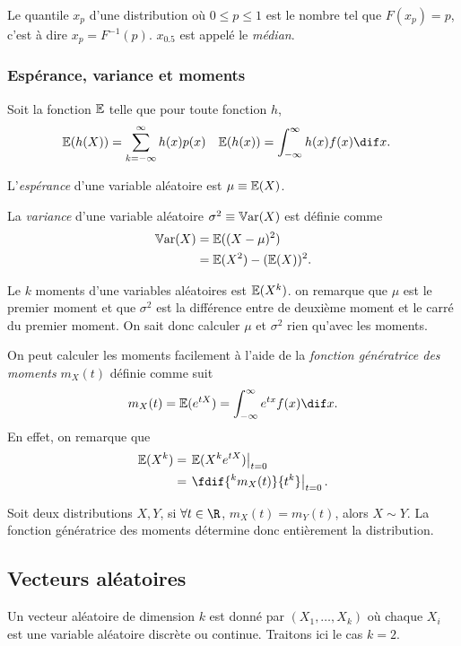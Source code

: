 Le quantile $x_p$ d'une distribution où $0 \leq p \leq 1$ est le nombre tel que
$F(x_p) = p$, c'est à dire $x_p = F^{-1}(p)$.
$x_{0.5}$ est appelé le \emph{médian}.

\subsubsection{Espérance, variance et moments}
Soit la fonction $\mathbb{E}$ telle que pour toute fonction $h$,
\begin{align*}
  \E(h(X)) & = \sum_{k = -\infty}^{\infty} h(x)p(x) & \E(h(x)) & = \int_{-\infty}^\infty h(x)f(x) \dif x.
\end{align*}

L'\emph{espérance} d'une variable aléatoire est $\mu \equiv \mathbb{E}(X)$.

La \emph{variance} d'une variable aléatoire $\sigma^2 \equiv \operatorname{\mathbb{V}ar}(X)$ est définie comme
\begin{align*}
  \operatorname{\mathbb{V}ar}(X) & = \mathbb{E}((X-\mu)^2)\\
          & = \mathbb{E}(X^2) - (\mathbb{E}(X))^2.
\end{align*}

Le $k$\ieme{} moments d'une variables aléatoires est $\mathbb{E}(X^k)$.
on remarque que $\mu$ est le premier moment et que $\sigma^2$ est
la différence entre de deuxième moment et le carré du premier moment.
On sait donc calculer $\mu$ et $\sigma^2$ rien qu'avec les moments.

On peut calculer les moments facilement à l'aide de
la \emph{fonction génératrice des moments} $m_X(t)$ définie comme suit
\[ m_X(t) = \E(e^{tX}) = \int_{-\infty}^\infty e^{tx} f(x) \dif x. \]
En effet, on remarque que
\begin{align*}
  \E(X^k) & = \left.\E(X^k e^{tX})\right|_{t=0}\\
          & = \left.\fdif{^km_X(t)}{t^k}\right|_{t = 0}.
\end{align*}

Soit deux distributions $X, Y$, si $\forall t \in \R$, $m_X(t) = m_Y(t)$,
alors $X \sim Y$.
La fonction génératrice des moments détermine donc entièrement la distribution.

\subsection{Vecteurs aléatoires}
Un vecteur aléatoire de dimension $k$ est donné par
$(X_1, \ldots, X_k)$ où chaque $X_i$ est une variable aléatoire discrète ou continue.
Traitons ici le cas $k = 2$.

